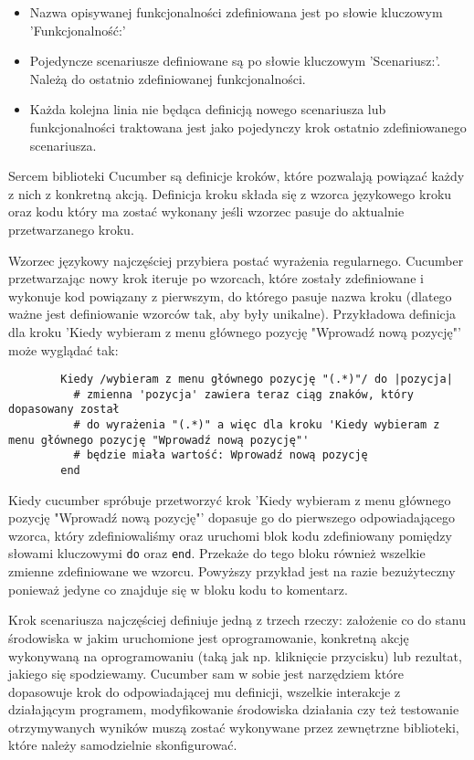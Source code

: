         \begin{itemize}
          \item Nazwa opisywanej funkcjonalności zdefiniowana jest po słowie kluczowym 'Funkcjonalność:'
          \item Pojedyncze scenariusze definiowane są po słowie kluczowym 'Scenariusz:'. Należą do ostatnio zdefiniowanej funkcjonalności.
          \item Każda kolejna linia nie będąca definicją nowego scenariusza lub funkcjonalności traktowana jest jako pojedynczy krok ostatnio zdefiniowanego scenariusza.
        \end{itemize}
        
      Sercem biblioteki Cucumber są definicje kroków, które pozwalają powiązać każdy z nich z konkretną akcją. Definicja kroku składa się z wzorca językowego kroku oraz kodu który ma zostać wykonany jeśli wzorzec pasuje do aktualnie przetwarzanego kroku.
      
      Wzorzec językowy najczęściej przybiera postać wyrażenia regularnego. Cucumber przetwarzając nowy krok iteruje po wzorcach, które zostały zdefiniowane i wykonuje kod powiązany z pierwszym, do którego pasuje nazwa kroku (dlatego ważne jest definiowanie wzorców tak, aby były unikalne). Przykładowa definicja dla kroku 'Kiedy wybieram z menu głównego pozycję "Wprowadź nową pozycję"' może wyglądać tak:
      
      \begin{verbatim}
        Kiedy /wybieram z menu głównego pozycję "(.*)"/ do |pozycja|
          # zmienna 'pozycja' zawiera teraz ciąg znaków, który dopasowany został
          # do wyrażenia "(.*)" a więc dla kroku 'Kiedy wybieram z menu głównego pozycję "Wprowadź nową pozycję"'
          # będzie miała wartość: Wprowadź nową pozycję
        end
      \end{verbatim}
      
      Kiedy cucumber spróbuje przetworzyć krok 'Kiedy wybieram z menu głównego pozycję "Wprowadź nową pozycję"' dopasuje go do pierwszego odpowiadającego wzorca, który zdefiniowaliśmy oraz uruchomi blok kodu zdefiniowany pomiędzy słowami kluczowymi \verb+do+ oraz \verb+end+. Przekaże do tego bloku również wszelkie zmienne zdefiniowane we wzorcu. Powyższy przykład jest na razie bezużyteczny ponieważ jedyne co znajduje się w bloku kodu to komentarz.
      
      Krok scenariusza najczęściej definiuje jedną z trzech rzeczy: założenie co do stanu środowiska w jakim uruchomione jest oprogramowanie, konkretną akcję wykonywaną na oprogramowaniu (taką jak np. kliknięcie przycisku) lub rezultat, jakiego się spodziewamy. Cucumber sam w sobie jest narzędziem które dopasowuje krok do odpowiadającej mu definicji, wszelkie interakcje z działającym programem, modyfikowanie środowiska działania czy też testowanie otrzymywanych wyników muszą zostać wykonywane przez zewnętrzne biblioteki, które należy samodzielnie skonfigurować.
      
